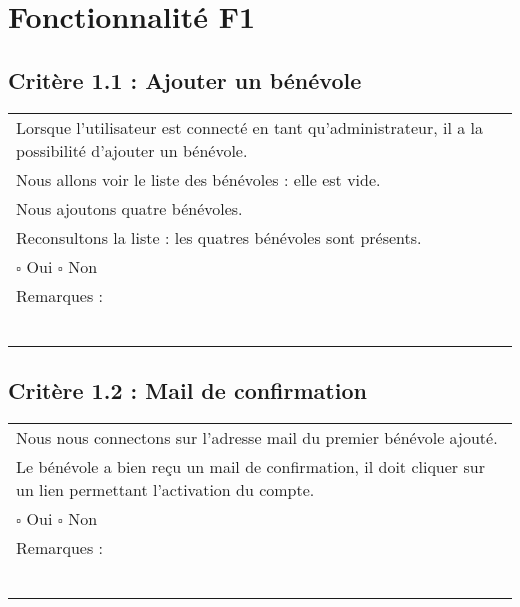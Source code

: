 
\section{Fonctionnalité F1}

	\subsection*{Critère 1.1 : Ajouter un bénévole}
	
		\begin{center}
    	 		\begin{tabular}[h]{|p{}|}
			\hline
				Lorsque l'utilisateur est connecté en tant qu'administrateur, il a la possibilité d'ajouter un bénévole. \\
				Nous allons voir le liste des bénévoles : elle est vide. \\
				Nous ajoutons quatre bénévoles. \\
				Reconsultons la liste : les quatres bénévoles sont présents. \\
				
				$\square$ Oui \hfill \hfill $\square$ Non \\\hline Remarques : \\ ~\\
			 \\\hline
     		\end{tabular}
  		\end{center}	
  		
  		
	\subsection*{Critère 1.2 : Mail de confirmation}
	
		\begin{center}
    	 		\begin{tabular}[h]{|p{}|}
			\hline
				Nous nous connectons sur l'adresse mail du premier bénévole ajouté. \\
				Le bénévole a bien reçu un mail de confirmation, il doit cliquer sur un lien permettant l'activation du compte. \\ 
				
				$\square$ Oui  \hfill \hfill $\square$ Non \\\hline Remarques : \\ ~\\
			 \\\hline
     		\end{tabular}
  		\end{center}	
  		
